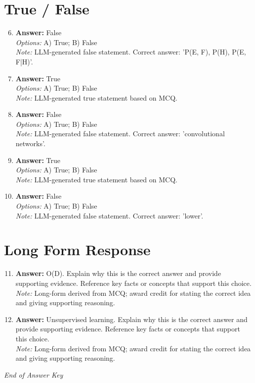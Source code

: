 \documentclass[12pt]{article}
\begin{document}
\section*{True / False}
\begin{enumerate}[label=\arabic*.]
\setcounter{enumi}{5}
\item \textbf{Answer:} False
\\ \textit{Options:} A) True; B) False
\\ \textit{Note:} LLM-generated false statement. Correct answer: 'P(E, F), P(H), P(E, F|H)'.
\item \textbf{Answer:} True
\\ \textit{Options:} A) True; B) False
\\ \textit{Note:} LLM-generated true statement based on MCQ.
\item \textbf{Answer:} False
\\ \textit{Options:} A) True; B) False
\\ \textit{Note:} LLM-generated false statement. Correct answer: 'convolutional networks'.
\item \textbf{Answer:} True
\\ \textit{Options:} A) True; B) False
\\ \textit{Note:} LLM-generated true statement based on MCQ.
\item \textbf{Answer:} False
\\ \textit{Options:} A) True; B) False
\\ \textit{Note:} LLM-generated false statement. Correct answer: 'lower'.
\end{enumerate}

\section*{Long Form Response}
\begin{enumerate}[label=\arabic*.]
\setcounter{enumi}{10}
\item \textbf{Answer:} O(D). Explain why this is the correct answer and provide supporting evidence. Reference key facts or concepts that support this choice.
\\ \textit{Note:} Long-form derived from MCQ; award credit for stating the correct idea and giving supporting reasoning.
\item \textbf{Answer:} Unsupervised learning. Explain why this is the correct answer and provide supporting evidence. Reference key facts or concepts that support this choice.
\\ \textit{Note:} Long-form derived from MCQ; award credit for stating the correct idea and giving supporting reasoning.
\end{enumerate}

\vfill
\noindent\textit{End of Answer Key}
\end{document}
